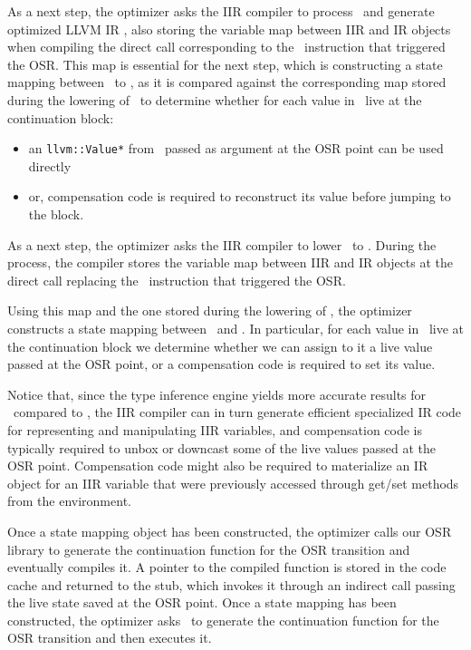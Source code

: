 \begin{enumerate}[noitemsep]
\begin{enumerate}
\ifdefined \fullver
As a next step, the optimizer asks the IIR compiler to process \fOptIIR\ and generate optimized LLVM IR \fOptIR, also storing the variable map between IIR and IR objects when compiling the direct call corresponding to the \feval\ instruction that triggered the OSR.
This map is essential for the next step, which is constructing a state mapping between \fIR\ to \fOptIR, as it is compared against the corresponding map stored during the lowering of \fIIR\ to determine whether for each value in \fOptIR\ live at the continuation block:
\begin{itemize}[noitemsep, partopsep=0.5ex, topsep=0.5ex]
\item an {\tt llvm::Value*} from \fIR\ passed as argument at the OSR point can be used directly
\item or, compensation code is required to reconstruct its value before jumping to the block.
\end{itemize}
\else
As a next step, the optimizer asks the IIR compiler to lower \fOptIIR\ to \fOptIR. During the process, the compiler stores the variable map between IIR and IR objects at the direct call replacing the \feval\ instruction that triggered the OSR.

Using this map and the one stored during the lowering of \fIIR, the optimizer constructs a state mapping between \fIR\ and \fOptIR. In particular, for each value in \fOptIR\ live at the continuation block we determine whether we can assign to it a live value passed at the OSR point, or a compensation code is required to set its value.

Notice that, since the type inference engine yields more accurate results for \fOptIIR\ compared to \fIIR, the IIR compiler can in turn generate efficient specialized IR code for representing and manipulating IIR variables, and compensation code is typically required to unbox or downcast some of the live values passed at the OSR point.
\ifdefined \fullver
Compensation code might also be required to materialize an IR object for an IIR variable that were previously accessed through get/set methods from the environment. %
\fi

\ifdefined \fullver
Once a state mapping object has been constructed, the optimizer calls our OSR library to generate the continuation function for the OSR transition and eventually compiles it.
A pointer to the compiled function is stored in the code cache and returned to the stub, which invokes it through an indirect call passing the live state saved at the OSR point.
\else
\noindent Once a state mapping has been constructed, the optimizer asks \osrkit\ to generate the continuation function for the OSR transition and then executes it.
\fi


\end{enumerate}
\end{enumerate}

